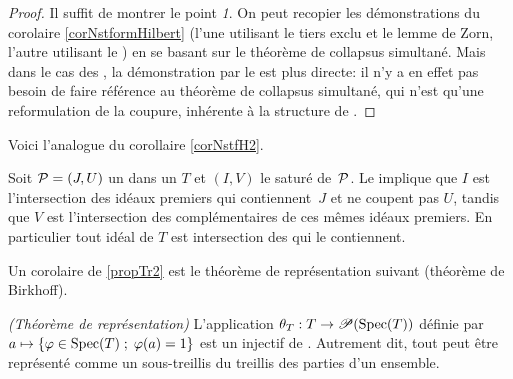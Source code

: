 %
\begin{proof}
Il suffit de montrer le point \emph{1}. On peut recopier les démonstrations du corolaire \ref{corNstformHilbert}
(l'une utilisant le tiers exclu et le lemme de Zorn, l'autre utilisant le \tcg) en se basant sur le théorème de collapsus simultané.
Mais dans le cas des \trdis, la démonstration par le \tcg est plus directe:
il n'y a en effet pas besoin de faire référence au théorème de collapsus simultané,
qui n'est qu'une reformulation de la coupure, inhérente à la structure de \trdi.

\noindent {}
\end{proof}
%

Voici l'analogue du corollaire \ref{corNstfH2}.

\begin{corollary} 
\label{corNstfH2Tr} 
Soit ${\cal P}=(J,U)$  un \proi dans un \trdi $T$ et
 $(I,V)$ le saturé de~${\cal P}$. Le \tcg implique que $I$ est l'intersection 
des idéaux premiers qui contiennent~$J$ et ne coupent pas $U$,
tandis que $V$ est l'intersection des complémentaires de ces mêmes 
idéaux premiers. En particulier tout idéal de $T$ est intersection des \ideps qui le contiennent.
\end{corollary}


Un corolaire de \ref{propTr2} est le théorème de représentation suivant
(théorème de Birkhoff).
\begin{theorem}
\label{thRep} {\em (Théorème de représentation)}
\Tcgi L'application
$\theta_T: T\rightarrow \mathscr{P}({\rm Spec}(T))$ définie par
$a\mapsto \left\{\varphi\in {\rm Spec}(T)\; ;\; \varphi(a)=1 \right\}$
est un \homo injectif de \trdis. Autrement dit, tout \trdi peut être
représenté comme un sous-treillis du treillis des parties d'un ensemble.
\end{theorem}

